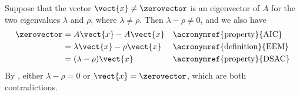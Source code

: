 Suppose that the vector $\vect{x}\neq\zerovector$ is an eigenvector of $A$ for the two eigenvalues $\lambda$ and $\rho$, where $\lambda\neq\rho$.  Then $\lambda-\rho\neq 0$, and we also have
%
\begin{align*}
\zerovector
&=A\vect{x}-A\vect{x}&&\text{\acronymref{property}{AIC}}\\
&=\lambda\vect{x}-\rho\vect{x}&&\text{\acronymref{definition}{EEM}}\\
&=(\lambda-\rho)\vect{x}&&\text{\acronymref{property}{DSAC}}
\end{align*}
%
By , either $\lambda-\rho=0$ or $\vect{x}=\zerovector$, which are both contradictions.
